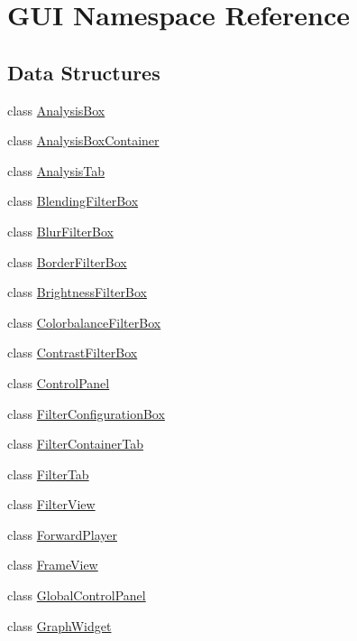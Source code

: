 \hypertarget{namespaceGUI}{}\section{G\+U\+I Namespace Reference}
\label{namespaceGUI}
\subsection*{Data Structures}
\begin{DoxyCompactItemize}
\item 
class \hyperlink{classGUI_1_1AnalysisBox}{Analysis\+Box}
\item 
class \hyperlink{classGUI_1_1AnalysisBoxContainer}{Analysis\+Box\+Container}
\item 
class \hyperlink{classGUI_1_1AnalysisTab}{Analysis\+Tab}
\item 
class \hyperlink{classGUI_1_1BlendingFilterBox}{Blending\+Filter\+Box}
\item 
class \hyperlink{classGUI_1_1BlurFilterBox}{Blur\+Filter\+Box}
\item 
class \hyperlink{classGUI_1_1BorderFilterBox}{Border\+Filter\+Box}
\item 
class \hyperlink{classGUI_1_1BrightnessFilterBox}{Brightness\+Filter\+Box}
\item 
class \hyperlink{classGUI_1_1ColorbalanceFilterBox}{Colorbalance\+Filter\+Box}
\item 
class \hyperlink{classGUI_1_1ContrastFilterBox}{Contrast\+Filter\+Box}
\item 
class \hyperlink{classGUI_1_1ControlPanel}{Control\+Panel}
\item 
class \hyperlink{classGUI_1_1FilterConfigurationBox}{Filter\+Configuration\+Box}
\item 
class \hyperlink{classGUI_1_1FilterContainerTab}{Filter\+Container\+Tab}
\item 
class \hyperlink{classGUI_1_1FilterTab}{Filter\+Tab}
\item 
class \hyperlink{classGUI_1_1FilterView}{Filter\+View}
\item 
class \hyperlink{classGUI_1_1ForwardPlayer}{Forward\+Player}
\item 
class \hyperlink{classGUI_1_1FrameView}{Frame\+View}
\item 
class \hyperlink{classGUI_1_1GlobalControlPanel}{Global\+Control\+Panel}
\item 
class \hyperlink{classGUI_1_1GraphWidget}{Graph\+Widget}
\item 

\end{DoxyCompactItemize}
